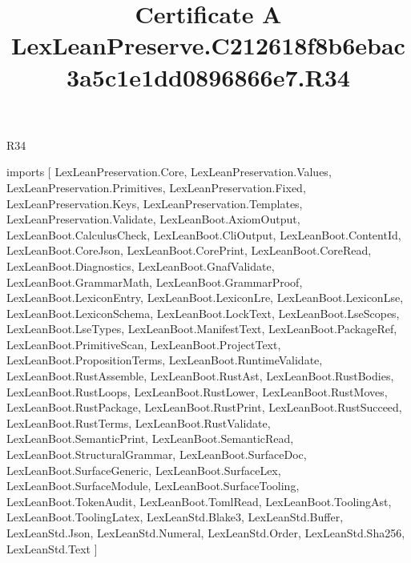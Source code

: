 \begin{lexlean}{R34}
\title{Certificate A LexLeanPreserve.C212618f8b6ebac3a5c1e1dd0896866e7.R34}
\begin{coremodule}
imports [
  LexLeanPreservation.Core,
  LexLeanPreservation.Values,
  LexLeanPreservation.Primitives,
  LexLeanPreservation.Fixed,
  LexLeanPreservation.Keys,
  LexLeanPreservation.Templates,
  LexLeanPreservation.Validate,
  LexLeanBoot.AxiomOutput,
  LexLeanBoot.CalculusCheck,
  LexLeanBoot.CliOutput,
  LexLeanBoot.ContentId,
  LexLeanBoot.CoreJson,
  LexLeanBoot.CorePrint,
  LexLeanBoot.CoreRead,
  LexLeanBoot.Diagnostics,
  LexLeanBoot.GnafValidate,
  LexLeanBoot.GrammarMath,
  LexLeanBoot.GrammarProof,
  LexLeanBoot.LexiconEntry,
  LexLeanBoot.LexiconLre,
  LexLeanBoot.LexiconLse,
  LexLeanBoot.LexiconSchema,
  LexLeanBoot.LockText,
  LexLeanBoot.LseScopes,
  LexLeanBoot.LseTypes,
  LexLeanBoot.ManifestText,
  LexLeanBoot.PackageRef,
  LexLeanBoot.PrimitiveScan,
  LexLeanBoot.ProjectText,
  LexLeanBoot.PropositionTerms,
  LexLeanBoot.RuntimeValidate,
  LexLeanBoot.RustAssemble,
  LexLeanBoot.RustAst,
  LexLeanBoot.RustBodies,
  LexLeanBoot.RustLoops,
  LexLeanBoot.RustLower,
  LexLeanBoot.RustMoves,
  LexLeanBoot.RustPackage,
  LexLeanBoot.RustPrint,
  LexLeanBoot.RustSucceed,
  LexLeanBoot.RustTerms,
  LexLeanBoot.RustValidate,
  LexLeanBoot.SemanticPrint,
  LexLeanBoot.SemanticRead,
  LexLeanBoot.StructuralGrammar,
  LexLeanBoot.SurfaceDoc,
  LexLeanBoot.SurfaceGeneric,
  LexLeanBoot.SurfaceLex,
  LexLeanBoot.SurfaceModule,
  LexLeanBoot.SurfaceTooling,
  LexLeanBoot.TokenAudit,
  LexLeanBoot.TomlRead,
  LexLeanBoot.ToolingAst,
  LexLeanBoot.ToolingLatex,
  LexLeanStd.Blake3,
  LexLeanStd.Buffer,
  LexLeanStd.Json,
  LexLeanStd.Numeral,
  LexLeanStd.Order,
  LexLeanStd.Sha256,
  LexLeanStd.Text
]


\end{coremodule}
\end{lexlean}
